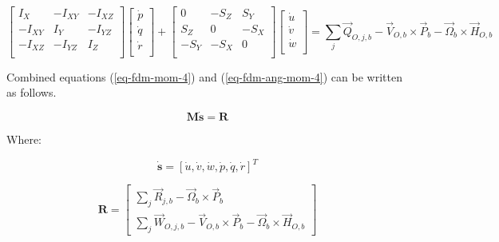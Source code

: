 \begin{equation}
  \label{eq-fdm-ang-mom-4}
  \left[
    \begin{matrix}
       I_X    & -I_{XY} & -I_{XZ} \\
      -I_{XY} &  I_Y    & -I_{YZ} \\
      -I_{XZ} & -I_{YZ} &  I_Z    \\
    \end{matrix}
  \right]
  \left[
    \begin{matrix}
      \dot p \\
      \dot q \\
      \dot r \\
    \end{matrix}
  \right]
  +
  \left[
    \begin{matrix}
         0 & -S_Z &  S_Y \\
       S_Z &    0 & -S_X \\
      -S_Y & -S_X &    0 \\
    \end{matrix}
  \right]
  \left[
    \begin{matrix}
      \dot u \\
      \dot v \\
      \dot w \\
    \end{matrix}
  \right]
  =
  \sum_j {\vec Q}_{O,j,b}
  -
  {\vec V}_{O,b} \times {\vec P}_b
  -
  {\vec \Omega}_b \times {\vec H}_{O,b}
\end{equation}

Combined equations (\ref{eq-fdm-mom-4}) and (\ref{eq-fdm-ang-mom-4}) can be written as follows. \cite{Sibilski2004}

\begin{equation}
  \label{eq-fdm-motion-1}
  \boldsymbol M \dot {\boldsymbol s} = \boldsymbol R
\end{equation}

Where:

\begin{equation}
  \dot {\boldsymbol s}
  =
  \left[ \dot u, \dot v, \dot w, \dot p, \dot q, \dot r \right]^T
\end{equation}

\begin{equation}
  {\boldsymbol R}
  =
  \left[
    \begin{array}{c}
      \sum_j {\vec R}_{j,b} - {\vec \Omega}_b \times {\vec P}_b \\
      \sum_j {\vec W}_{O,j,b} - {\vec V}_{O,b} \times {\vec P}_b - {\vec \Omega}_b \times {\vec H}_{O,b}
    \end{array}
  \right]
\end{equation}

